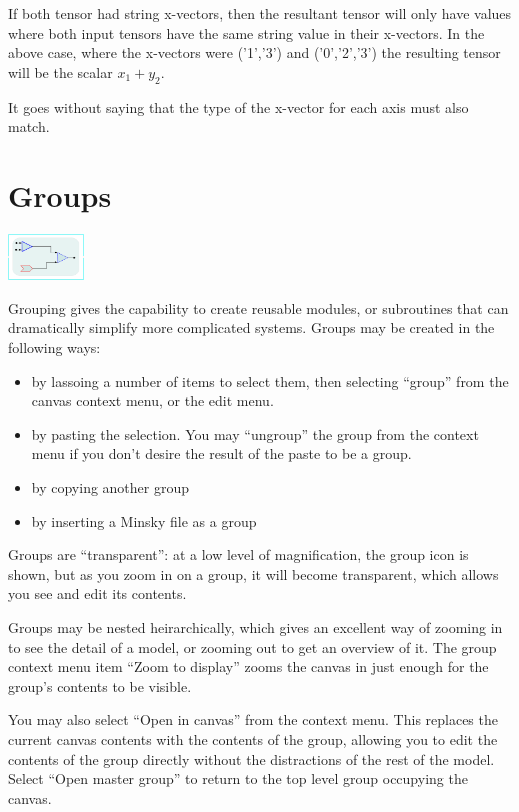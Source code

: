 If both tensor had string x-vectors, then the resultant tensor will
only have values where both input tensors have the same string value
in their x-vectors. In the above case, where the x-vectors were ('1','3')
and ('0','2','3') the resulting tensor will be the scalar $x_{1}+y_{2}$.

It goes without saying that the type of the x-vector for each axis
must also match.

\section{Groups}

\label{Group}

\includegraphics[width=2cm]{images/group}

Grouping gives the capability to create reusable modules, or subroutines
that can dramatically simplify more complicated systems. Groups may
be created in the following ways: 
\begin{itemize}
\item by lassoing a number of items to select them, then selecting ``group''
from the canvas context menu, or the edit menu. 
\item by pasting the selection. You may ``ungroup'' the group from the
context menu if you don't desire the result of the paste to be a group. 
\item by copying another group 
\item by inserting a Minsky file as a group 
\end{itemize}
Groups are ``transparent'': at a low level of magnification, the
group icon is shown, but as you zoom in on a group, it will become
transparent, which allows you see and edit its contents. 

Groups may be nested heirarchically, which gives an excellent way
of zooming in to see the detail of a model, or zooming out to get
an overview of it. The group context menu item ``Zoom to display''
zooms the canvas in just enough for the group's contents to be visible.

You may also select ``Open in canvas'' from the context menu. This
replaces the current canvas contents with the contents of the group,
allowing you to edit the contents of the group directly without the
distractions of the rest of the model. Select ``Open master group''
to return to the top level group occupying the canvas.

